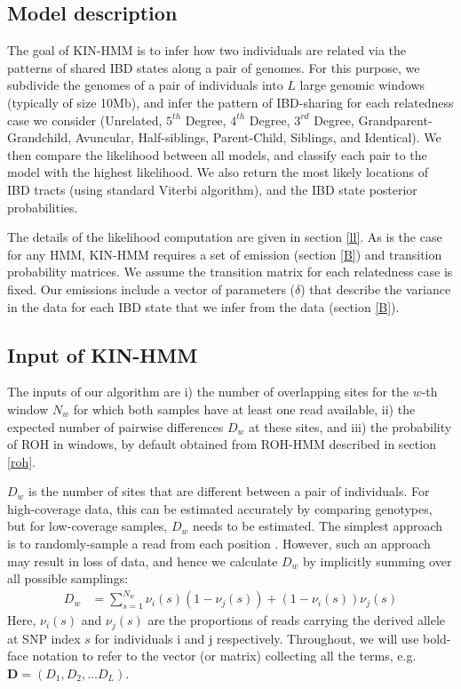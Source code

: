 \documentclass[12pt, letterpaper]{article}
\newcommand{\BD}{\mathbf{D}}
\begin{document}
\subsection{Model description}\label{method_overview} 
The goal of KIN-HMM is to infer how two individuals are related via the patterns of shared IBD states along a pair of genomes. For this purpose,  we subdivide the genomes of a pair of individuals into $L$ large genomic windows (typically of size 10Mb), and infer the pattern of IBD-sharing for each relatedness case we consider (Unrelated, $5^{th}$ Degree, $4^{th}$ Degree, $3^{rd}$ Degree, Grandparent-Grandchild, Avuncular, Half-siblings, Parent-Child, Siblings, and Identical). We then compare the likelihood between all models, and classify each pair to the model with the highest likelihood. We also return the most likely locations of IBD tracts (using standard Viterbi algorithm), and the IBD state posterior probabilities. 

The details of the likelihood computation are given in section \ref{ll}. As is the case for any HMM, KIN-HMM requires a set of emission (section \ref{B}) and transition probability matrices. We assume the transition matrix for each relatedness case is fixed. Our emissions include a vector of parameters ($\delta$) that describe the variance in the data for each IBD state that we infer from the data (section \ref{B}).

\subsection{Input of KIN-HMM}\label{hmm_input}
The inputs of our algorithm are i) the number of overlapping sites for the $w$-th window $N_w$ for which both samples have at least one read available, ii) the expected number of pairwise differences $D_w$ at these sites, and iii) the probability of ROH in windows, by default obtained from ROH-HMM described in section \ref{roh}.

$D_w$ is the number of sites that are different between a pair of individuals. For high-coverage data, this can be estimated accurately by comparing genotypes, but for low-coverage samples, $D_w$ needs to be estimated. The simplest approach is to randomly-sample a read from each position \cite{haak_massive_2015,prufer_complete_2014,green_draft_2010}. However, such an approach may result in loss of data, and hence we calculate $D_w$ by implicitly summing over all possible samplings:
\begin{align}\label{eq:x}
D_w &= \sum_{s=1}^{N_w} \nu_i(s) (1-\nu_j(s)) + (1-\nu_i(s)) \nu_j(s)
\end{align}
Here, $\nu_i(s)$ and $\nu_j(s)$ are the proportions of reads carrying the derived allele at SNP index $s$ for individuals i and j respectively.
Throughout, we will use bold-face notation to refer to the vector (or matrix) collecting  all the terms, e.g. $\BD = (D_1, D_2, \dots D_L)$. 
\end{document}
